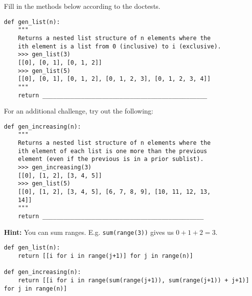 \begin{blocksection}
\question Fill in the methods below according to the doctests.
\end{blocksection}

\begin{lstlisting}
def gen_list(n):
    """
    Returns a nested list structure of n elements where the 
    ith element is a list from 0 (inclusive) to i (exclusive).
    >>> gen_list(3)
    [[0], [0, 1], [0, 1, 2]]
    >>> gen_list(5)
    [[0], [0, 1], [0, 1, 2], [0, 1, 2, 3], [0, 1, 2, 3, 4]]
    """
    return _______________________________________________
\end{lstlisting}

For an additional challenge, try out the following:

\begin{lstlisting}
def gen_increasing(n):
    """
    Returns a nested list structure of n elements where the 
    ith element of each list is one more than the previous 
    element (even if the previous is in a prior sublist).
    >>> gen_increasing(3)
    [[0], [1, 2], [3, 4, 5]]
    >>> gen_list(5)
    [[0], [1, 2], [3, 4, 5], [6, 7, 8, 9], [10, 11, 12, 13, 
    14]]
    """
    return ______________________________________________
\end{lstlisting}

\textbf{Hint:} You can sum ranges. E.g. \texttt{sum(range(3))} gives us $0 + 1 + 2 = 3$.

\begin{solution}
\begin{lstlisting}
def gen_list(n):
    return [[i for i in range(j+1)] for j in range(n)]

def gen_increasing(n):
	return [[i for i in range(sum(range(j+1)), sum(range(j+1)) + j+1)] for j in range(n)]
\end{lstlisting}
\end{solution}